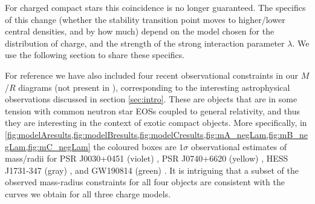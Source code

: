 \documentclass[12pt,noshowpacs,nofootinbib,notitlepage,amsmath,superscriptaddress]{revtex4-1}%
\begin{document}
For charged compact stars this coincidence is no longer guaranteed. The specifics of this change (whether the stability transition point moves to higher/lower central densities, and by how much) depend on the model chosen for the distribution of charge, and the strength of the strong interaction parameter $\lambda$. We use the following section to share these specifics.

 For reference we have also included four recent observational constraints in our $M$/$R$ diagrams (not present in \cite{zhang:2021}), corresponding to the interesting astrophysical observations discussed in section \ref{sec:intro}. These are objects that are in some tension with common neutron star EOSs coupled to general relativity, and thus they are interesting in the context of exotic compact objects. More specifically, in \cref{fig:modelAresults,fig:modelBresults,fig:modelCresults,fig:mA_negLam,fig:mB_negLam,fig:mC_negLam} the coloured boxes are $1\sigma$ observational estimates of mass/radii for PSR J0030+0451 (violet) \cite{Miller_2019}, PSR J0740+6620 (yellow) \cite{salmi2024}, HESS J1731-347 (gray) \cite{Horvath_2023}, and GW190814 (green) \cite{Abbott_2020}. It is intriguing that a subset of the observed mass-radius constraints for all four objects are consistent with the curves we obtain for all three charge models.
\end{document}
